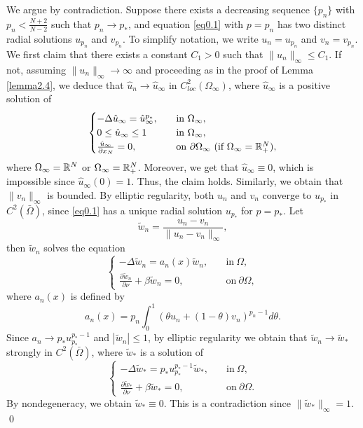 \documentclass[12pt,reqno]{amsart}
\numberwithin{equation}{section}
\theoremstyle{definition}
\def\R{{\mathfrak R}}
\def\R{\Bbb R}
\begin{document}
We argue by contradiction. Suppose there exists a decreasing sequence $\{p_n\}$ with $p_n<\frac{N+2}{N-2}$ such that $p_n\to p_*$, and equation \eqref{eq0.1} with $p=p_n$ has two distinct radial solutions $u_{p_n}$ and $v_{p_n}$. To simplify notation, we write $u_n=u_{p_n}$ and $v_n=v_{p_n}$. We first claim that there exists a constant $C_1>0$ such that $\|u_n\|_\infty \le C_1$.
If not, assuming $\|u_n\|_\infty\to\infty$ and proceeding as in the proof of Lemma \ref{lemma2.4}, we deduce that $\hat{u}_n\to\hat{u}_\infty$ in $C^2_{loc}(\Omega_\infty)$, where $\hat{u}_\infty$ is a positive solution of 
\begin{equation}\label{eq3.12}
\begin{cases}
-\Delta \hat{u}_\infty=\hat{u}_\infty^{p_*},\quad &\text{in}\ \Omega_\infty,\\
0\le\hat{u}_\infty\le 1 &\text{in}\ \Omega_\infty,\\
\frac{\hat{u}_\infty}{\partial x_N}=0, &\text{on}\ \partial\Omega_\infty \ (\text{if}\ \Omega_\infty=\R^N_+),
\end{cases}
\end{equation}
where $\Omega_\infty=\R^N$ or $\Omega_\infty=\R^N_+$. Moreover, we get that $\hat{u}_\infty\equiv 0$, which is impossible since $\hat{u}_\infty(0)=1$. Thus, the claim holds. Similarly, we obtain that $\|v_n\|_\infty$ is bounded. By elliptic regularity, both $u_n$ and $v_n$ converge to $u_{p_*}$ in $C^2(\bar{\Omega})$, since \eqref{eq0.1} has a unique radial solution $u_{p_*}$ for $p=p_*$. Let 
$$
\tilde{w}_n=\frac{u_n-v_n}{\|u_n-v_n\|_\infty},
$$
then $\tilde{w}_n$ solves the equation 
\begin{equation}
\begin{cases}
-\Delta \tilde{w}_n=a_n(x)\tilde{w}_n,\quad &\text{in}\ \Omega,\\
\frac{\partial \tilde{w}_n}{\partial \nu}+\beta \tilde{w}_n=0, &\text{on}\ \partial\Omega,
\end{cases}
\end{equation}
where $a_n(x)$ is defined by
$$
a_n(x)=p_n\int_0^1(\theta u_n+(1-\theta)v_n)^{p_n-1}d\theta.
$$
Since $a_n \to p_* u_{p_*}^{p_*-1}$ and $|\tilde{w}_n| \le 1$, by elliptic regularity we obtain that $\tilde{w}_n \to \tilde{w}_*$ strongly in $C^2(\bar{\Omega})$, where $\tilde{w}_*$ is a solution of 
\begin{equation}
\begin{cases}
-\Delta \tilde{w}_*=p_*u_{p_*}^{p_*-1}\tilde{w}_*,\quad &\text{in}\  \Omega,\\
\frac{\partial \tilde{w}_*}{\partial\nu}+\beta\tilde{w}_*=0, &\text{on}\ \partial\Omega.
\end{cases}
\end{equation}
By nondegeneracy, we obtain $\tilde{w}_*\equiv 0$. This is a contradiction since $\|\tilde{w}_*\|_\infty=1$.
\qed
\end{document}
